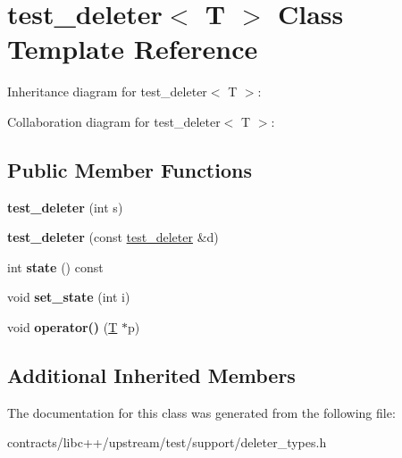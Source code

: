 \hypertarget{classtest__deleter}{}\section{test\+\_\+deleter$<$ T $>$ Class Template Reference}
\label{classtest__deleter}


Inheritance diagram for test\+\_\+deleter$<$ T $>$\+:


Collaboration diagram for test\+\_\+deleter$<$ T $>$\+:
\subsection*{Public Member Functions}
\begin{DoxyCompactItemize}
\item 
\mbox{\label{classtest__deleter_a02c9a00d1f8d034bbf2f560eeb69f6e4}} 
{\bfseries test\+\_\+deleter} (int s)
\item 
\mbox{\label{classtest__deleter_a9954f3cff07346e8846609b924aa5241}} 
{\bfseries test\+\_\+deleter} (const \mbox{\hyperlink{classtest__deleter}{test\+\_\+deleter}} \&d)
\item 
\mbox{\label{classtest__deleter_a364c4611876a0f16c6f1a33f9594d3e7}} 
int {\bfseries state} () const
\item 
\mbox{\label{classtest__deleter_add32949c02f2f58c59156fe8c7e3deea}} 
void {\bfseries set\+\_\+state} (int i)
\item 
\mbox{\label{classtest__deleter_a69102dc89398be014034c3ea159363dd}} 
void {\bfseries operator()} (\mbox{\hyperlink{struct_t}{T}} $\ast$p)
\end{DoxyCompactItemize}
\subsection*{Additional Inherited Members}


The documentation for this class was generated from the following file\+:\begin{DoxyCompactItemize}
\item 
contracts/libc++/upstream/test/support/deleter\+\_\+types.\+h\end{DoxyCompactItemize}
